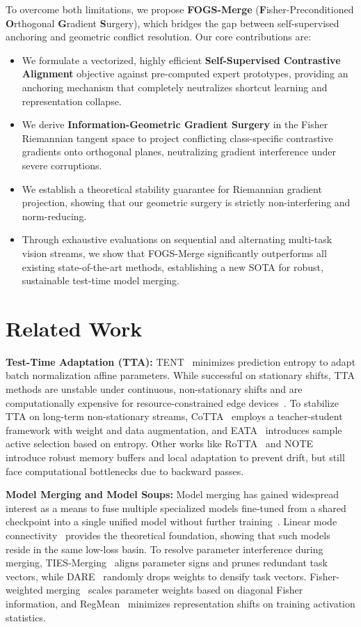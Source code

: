 \documentclass{article}
\theoremstyle{plain}
\theoremstyle{definition}
\theoremstyle{remark}
\begin{document}
To overcome both limitations, we propose \textbf{FOGS-Merge} (\textbf{F}isher-Preconditioned \textbf{O}rthogonal \textbf{G}radient \textbf{S}urgery), which bridges the gap between self-supervised anchoring and geometric conflict resolution. Our core contributions are:
\begin{itemize}
    \item We formulate a vectorized, highly efficient \textbf{Self-Supervised Contrastive Alignment} objective against pre-computed expert prototypes, providing an anchoring mechanism that completely neutralizes shortcut learning and representation collapse.
    \item We derive \textbf{Information-Geometric Gradient Surgery} in the Fisher Riemannian tangent space to project conflicting class-specific contrastive gradients onto orthogonal planes, neutralizing gradient interference under severe corruptions.
    \item We establish a theoretical stability guarantee for Riemannian gradient projection, showing that our geometric surgery is strictly non-interfering and norm-reducing.
    \item Through exhaustive evaluations on sequential and alternating multi-task vision streams, we show that FOGS-Merge significantly outperforms all existing state-of-the-art methods, establishing a new SOTA for robust, sustainable test-time model merging.
\end{itemize}

\section{Related Work}
\label{sec:related}
\textbf{Test-Time Adaptation (TTA):} TENT~\cite{tent} minimizes prediction entropy to adapt batch normalization affine parameters. While successful on stationary shifts, TTA methods are unstable under continuous, non-stationary shifts and are computationally expensive for resource-constrained edge devices~\cite{sar, ecotta}. To stabilize TTA on long-term non-stationary streams, CoTTA~\cite{cotta} employs a teacher-student framework with weight and data augmentation, and EATA~\cite{eata} introduces sample active selection based on entropy. Other works like RoTTA~\cite{rotta} and NOTE~\cite{note} introduce robust memory buffers and local adaptation to prevent drift, but still face computational bottlenecks due to backward passes.

\textbf{Model Merging and Model Soups:} Model merging has gained widespread interest as a means to fuse multiple specialized models fine-tuned from a shared checkpoint into a single unified model without further training~\cite{soups, task_arithmetic}. Linear mode connectivity~\cite{lmc, entezari} provides the theoretical foundation, showing that such models reside in the same low-loss basin. To resolve parameter interference during merging, TIES-Merging~\cite{ties_merging} aligns parameter signs and prunes redundant task vectors, while DARE~\cite{dare} randomly drops weights to densify task vectors. Fisher-weighted merging~\cite{fisher_merge} scales parameter weights based on diagonal Fisher information, and RegMean~\cite{regmean} minimizes representation shifts on training activation statistics.
\end{document}

